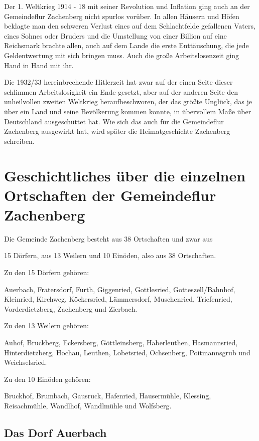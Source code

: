 \documentclass{book}
\begin{document}
Der 1. Weltkrieg 1914 - 18 mit seiner Revolution und Inflation ging auch an der
Gemeindeflur Zachenberg nicht spurlos vorüber. In allen Häusern und Höfen
beklagte man den schweren Verlust eines auf dem Schlachtfelde gefallenen Vaters,
eines Sohnes oder Bruders und die Umstellung von einer Billion auf eine
Reichsmark brachte allen, auch auf dem Lande die erste Enttäuschung, die jede
Geldentwertung mit sich bringen muss. Auch die große Arbeitslosenzeit ging Hand
in Hand mit ihr.

Die 1932/33 hereinbrechende Hitlerzeit hat zwar auf der einen Seite dieser
schlimmen Arbeitslosigkeit ein Ende gesetzt, aber auf der anderen Seite den
unheilvollen zweiten Weltkrieg heraufbeschworen, der das größte Unglück, das je
über ein Land und seine Bevölkerung kommen konnte, in übervollem Maße über
Deutschland ausgeschüttet hat. Wie sich das auch für die Gemeindeflur Zachenberg
ausgewirkt hat, wird später die Heimatgeschichte Zachenberg schreiben.



\chapter{Geschichtliches über die einzelnen Ortschaften der Gemeindeflur Zachenberg}

Die Gemeinde Zachenberg besteht aus 38 Ortschaften und zwar aus

15 Dörfern, aus 13 Weilern und 10 Einöden, also aus 38 Ortschaften.



Zu den 15 Dörfern gehören:

Auerbach, Fratersdorf, Furth, Giggenried, Gottlesried, Gotteszell/Bahnhof,
Kleinried, Kirchweg, Köckersried, Lämmersdorf, Muschenried, Triefenried,
Vorderdietzberg, Zachenberg und Zierbach.



Zu den 13 Weilern gehören:

Auhof, Bruckberg, Eckersberg, Göttleinsberg, Haberleuthen, Hasmannsried,
Hinterdietzberg, Hochau, Leuthen, Lobetsried, Ochsenberg, Poitmannsgrub und
Weichselsried.



Zu den 10 Einöden gehören:

Bruckhof, Brumbach, Gausruck, Hafenried, Hausermühle, Klessing, Reisachmühle,
Wandlhof, Wandlmühle und Wolfsberg.

\section{Das Dorf Auerbach}
\end{document}
